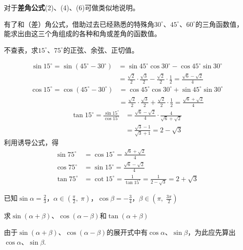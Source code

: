     对于\textbf{差角公式}(2)、(4)、(6)可做类似地说明。

    有了和（差）角公式，借助过去已经熟悉的特殊角$30^{\circ}$、$45^{\circ}$、$60^{\circ}$的三角函数值，能求出由这三个角组成的各种和角或差角的函数值。

\begin{example}
    不查表，求$15^{\circ}$、$75^{\circ}$的正弦、余弦、正切值。
\end{example}

\begin{solution}
\[\begin{split}
\sin15^{\circ}=\sin(45^{\circ}-30^{\circ})&=\sin45^{\circ}\cos30^{\circ}-\cos45^{\circ}\sin30^{\circ}\\
&=\frac{\sqrt{2}}{2}\cdot \frac{\sqrt{3}}{2}-\frac{\sqrt{2}}{2}\cdot \frac{1}{2}=\frac{\sqrt{6}-\sqrt{2}}{4}
\end{split} \]
\[\begin{split}
    \cos15^{\circ}=\cos(45^{\circ}-30^{\circ})&=\cos45^{\circ}\cos30^{\circ}+\sin45^{\circ}\sin30^{\circ}\\
    &=\frac{\sqrt{2}}{2}\cdot \frac{\sqrt{3}}{2}+\frac{\sqrt{2}}{2}\cdot \frac{1}{2}=\frac{\sqrt{6}+\sqrt{2}}{4}
\end{split} \]
\[\begin{split}
    \tan15^{\circ}=\frac{\sin15^{\circ}}{\cos15^{\circ}}&=\frac{\sqrt{6}-\sqrt{2}}{4}\cdot \frac{4}{\sqrt{6}+\sqrt{2}}\\
    &=\frac{\sqrt{3}-1}{\sqrt{3}+1}=2-\sqrt{3}
\end{split} \]
利用诱导公式，得
\[\begin{split}
\sin75^{\circ}&=\cos15^{\circ}=\frac{\sqrt{6}+\sqrt{2}}{4}\\
\cos75^{\circ}&=\sin15^{\circ}=\frac{\sqrt{6}-\sqrt{2}}{4}\\
\tan75^{\circ}&=\cot15^{\circ}=\frac{1}{\tan15^{\circ}}=\frac{1}{2-\sqrt{3}}=2+\sqrt{3}
\end{split} \]
\end{solution}

\begin{example}
已知$\sin\alpha=\frac{2}{3}$，$\alpha\in\left(\frac{\pi}{2},\; \pi\right)$，$\cos\beta=-\frac{3}{4}$，$\beta\in\left(\pi,\;\frac{3\pi}{2}\right)$

求$\sin(\alpha+\beta)$、$\cos(\alpha-\beta)$和$\tan(\alpha+\beta)$
\end{example}

\begin{analyze}
由于$\sin(\alpha+\beta)$、$\cos(\alpha-\beta)$的展开式中有$\cos\alpha$、$\sin\beta$，为此应先算出$\cos\alpha$、$\sin\beta$.
\end{analyze}

